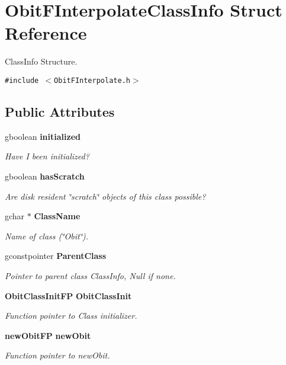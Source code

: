 \section{Obit\-FInterpolate\-Class\-Info Struct Reference}
\label{structObitFInterpolateClassInfo}
Class\-Info Structure.  


{\tt \#include $<$Obit\-FInterpolate.h$>$}

\subsection*{Public Attributes}
\begin{CompactItemize}
\item 
gboolean {\bf initialized}
\begin{CompactList}\small\item\em Have I been initialized? \item\end{CompactList}\item 
gboolean {\bf has\-Scratch}
\begin{CompactList}\small\item\em Are disk resident \char`\"{}scratch\char`\"{} objects of this class possible? \item\end{CompactList}\item 
gchar $\ast$ {\bf Class\-Name}
\begin{CompactList}\small\item\em Name of class (\char`\"{}Obit\char`\"{}). \item\end{CompactList}\item 
gconstpointer {\bf Parent\-Class}
\begin{CompactList}\small\item\em Pointer to parent class Class\-Info, Null if none. \item\end{CompactList}\item 
{\bf Obit\-Class\-Init\-FP} {\bf Obit\-Class\-Init}
\begin{CompactList}\small\item\em Function pointer to Class initializer. \item\end{CompactList}\item 
{\bf new\-Obit\-FP} {\bf new\-Obit}
\begin{CompactList}\small\item\em Function pointer to new\-Obit. \item\end{CompactList}\item 

\end{CompactItemize}

